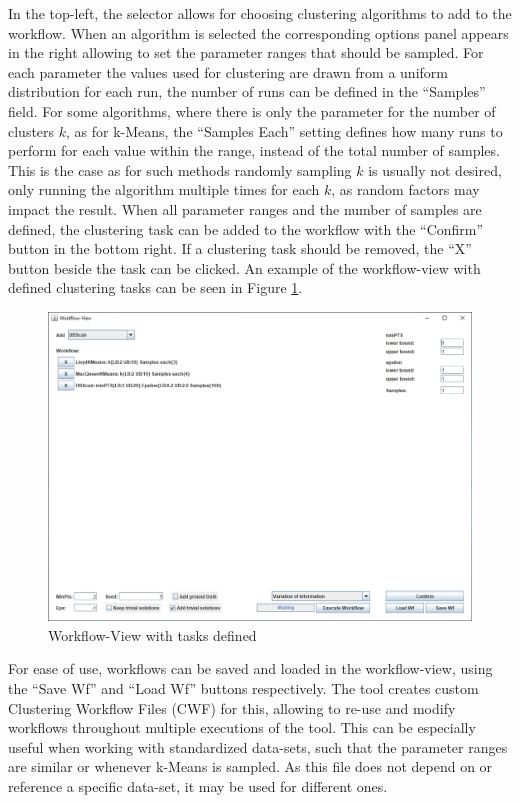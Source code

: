 \documentclass[
	a4paper,
	english,
	twoside,
	openright,               
	11pt                            
	]{report}
\begin{document}
In the top-left, the selector allows for choosing clustering algorithms to add to the workflow. When an algorithm is selected the corresponding options panel appears in the right allowing to set the parameter ranges that should be sampled. For each parameter the values used for clustering are drawn from a uniform distribution for each run, the number of runs can be defined in the ``Samples'' field. For some algorithms, where there is only the parameter for the number of clusters $k$, as for k-Means, the ``Samples Each'' setting defines how many runs to perform for each value within the range, instead of the total number of samples. This is the case as for such methods randomly sampling $k$ is usually not desired, only running the algorithm multiple times for each $k$, as random factors may impact the result. When all parameter ranges and the number of samples are defined, the clustering task can be added to the workflow with the ``Confirm'' button in the bottom right. If a clustering task should be removed, the ``X'' button beside the task can be clicked. An example of the workflow-view with defined clustering tasks can be seen in Figure \ref{fig:workflow-view-tasks}.

\begin{figure}[h]
	\centering
	\includegraphics[scale=.43]{workflow-view-tasks}
	\caption{Workflow-View with tasks defined}
	\label{fig:workflow-view-tasks}
\end{figure}

For ease of use, workflows can be saved and loaded in the workflow-view, using the ``Save Wf'' and ``Load Wf'' buttons respectively. The tool creates custom Clustering Workflow Files (CWF) for this, allowing to re-use and modify workflows throughout multiple executions of the tool. This can be especially useful when working with standardized data-sets, such that the parameter ranges are similar or whenever k-Means is sampled. As this file does not depend on or reference a specific data-set, it may be used for different ones.
\end{document}
